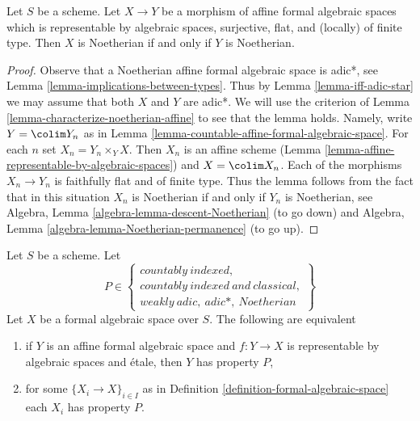 \begin{lemma}
\label{lemma-iff-noetherian}
Let $S$ be a scheme. Let $X \to Y$ be a morphism of affine
formal algebraic spaces which is representable by algebraic spaces,
surjective, flat, and (locally) of finite type. Then $X$ is Noetherian
if and only if $Y$ is Noetherian.
\end{lemma}

\begin{proof}
Observe that a Noetherian affine formal algebraic space is adic*, see
Lemma \ref{lemma-implications-between-types}. Thus by
Lemma \ref{lemma-iff-adic-star} we may assume that both $X$ and $Y$
are adic*. We will use the criterion of
Lemma \ref{lemma-characterize-noetherian-affine}
to see that the lemma holds. Namely, write $Y = \colim Y_n$
as in Lemma \ref{lemma-countable-affine-formal-algebraic-space}.
For each $n$ set $X_n = Y_n \times_Y X$. Then $X_n$ is an
affine scheme (Lemma \ref{lemma-affine-representable-by-algebraic-spaces})
and $X = \colim X_n$. Each of the morphisms $X_n \to Y_n$ is
faithfully flat and of finite type. Thus the lemma follows from the
fact that in this situation $X_n$ is Noetherian if and only if $Y_n$
is Noetherian, see
Algebra, Lemma \ref{algebra-lemma-descent-Noetherian} (to go down)
and
Algebra, Lemma \ref{algebra-lemma-Noetherian-permanence} (to go up).
\end{proof}

\begin{lemma}
\label{lemma-type-local}
Let $S$ be a scheme. Let
$$
P \in
\left\{
\begin{matrix}
countably\ indexed,\\
countably\ indexed\ and\ classical,\\
weakly\ adic,\ adic*,\ Noetherian
\end{matrix}
\right\}
$$
Let $X$ be a formal algebraic space over $S$.
The following are equivalent
\begin{enumerate}
\item if $Y$ is an affine formal algebraic space and
$f : Y \to X$ is representable by algebraic spaces and \'etale,
then $Y$ has property $P$,
\item for some $\{X_i \to X\}_{i \in I}$ as in
Definition \ref{definition-formal-algebraic-space}
each $X_i$ has property $P$.
\end{enumerate}
\end{lemma}

